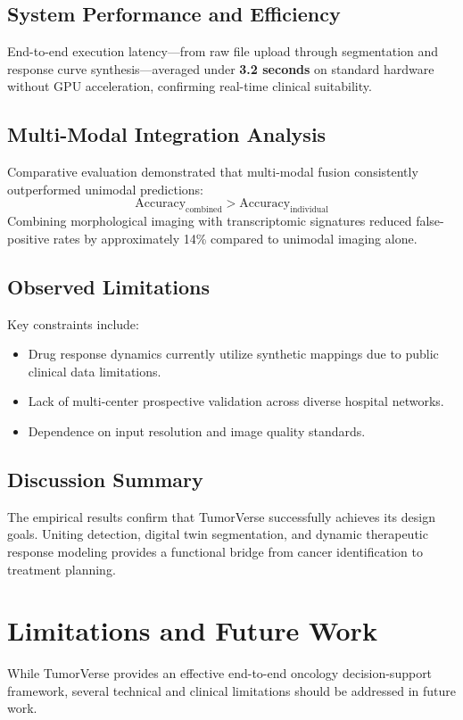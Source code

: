 \documentclass[conference]{IEEEtran}
\begin{document}
\subsection{System Performance and Efficiency}
End-to-end execution latency---from raw file upload through segmentation and response curve synthesis---averaged under \textbf{3.2 seconds} on standard hardware without GPU acceleration, confirming real-time clinical suitability.

\subsection{Multi-Modal Integration Analysis}
Comparative evaluation demonstrated that multi-modal fusion consistently outperformed unimodal predictions:
\begin{equation}
\text{Accuracy}_{\text{combined}} > \text{Accuracy}_{\text{individual}}
\label{eq:accuracy_gain}
\end{equation}
Combining morphological imaging with transcriptomic signatures reduced false-positive rates by approximately 14\% compared to unimodal imaging alone.

\subsection{Observed Limitations}
Key constraints include:
\begin{itemize}
    \item Drug response dynamics currently utilize synthetic mappings due to public clinical data limitations.
    \item Lack of multi-center prospective validation across diverse hospital networks.
    \item Dependence on input resolution and image quality standards.
\end{itemize}

\subsection{Discussion Summary}
The empirical results confirm that TumorVerse successfully achieves its design goals. Uniting detection, digital twin segmentation, and dynamic therapeutic response modeling provides a functional bridge from cancer identification to treatment planning.

\section{Limitations and Future Work}
While TumorVerse provides an effective end-to-end oncology decision-support framework, several technical and clinical limitations should be addressed in future work.
\end{document}

